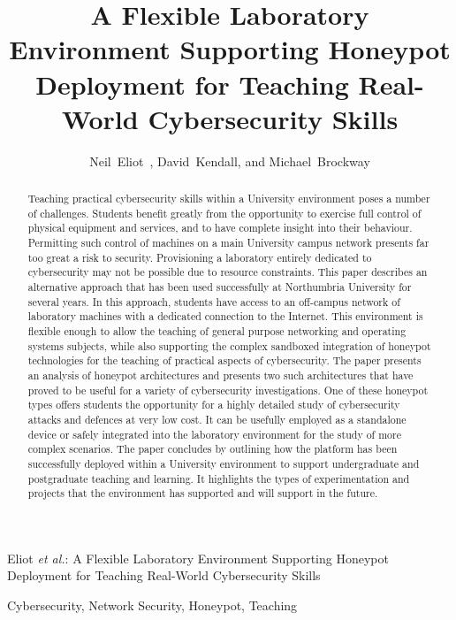 \documentclass[10pt,journal]{IEEEtran}
\begin{document}
\title{A Flexible Laboratory Environment Supporting Honeypot Deployment for 
Teaching Real-World Cybersecurity Skills
}


\author{Neil~Eliot~, 
        David~Kendall, 
        and Michael~Brockway}


%
{Eliot \MakeLowercase{\textit{et al.}}: A Flexible Laboratory Environment Supporting Honeypot Deployment for Teaching Real-World Cybersecurity Skills}

\maketitle

\begin{abstract}
  Teaching practical cybersecurity skills within a University environment poses
  a number of challenges. Students benefit greatly from the opportunity to
  exercise full control of physical equipment and services, and to have
  complete insight into their behaviour. Permitting such control of machines on
  a main University campus network presents far too great a risk to security.
  Provisioning a laboratory entirely dedicated to cybersecurity may not be
  possible due to resource constraints. This paper describes an alternative
  approach that has been used successfully at Northumbria University for
  several years. In this approach, students have access to an off-campus
  network of laboratory machines with a dedicated connection to the Internet.
  This environment is flexible enough to allow the teaching of general purpose
  networking and operating systems subjects, while also supporting the complex
  sandboxed integration of honeypot technologies for the teaching of practical
  aspects of cybersecurity. The paper presents an analysis of honeypot
  architectures and presents two such architectures that have proved to be
  useful for a variety of cybersecurity investigations.  One of these honeypot
  types offers students the opportunity for a highly detailed study of
  cybersecurity attacks and defences at very low cost. It can be usefully
  employed as a standalone device or safely integrated into the laboratory
  environment for the study of more complex scenarios.  The paper concludes by
  outlining how the platform has been successfully deployed within a University
  environment to support undergraduate and postgraduate teaching and learning.
  It highlights the types of experimentation and projects that the environment
  has supported and will support in the future.
\end{abstract}
\begin{IEEEkeywords}
  Cybersecurity, Network Security, Honeypot, Teaching
\end{IEEEkeywords}
\end{document}

